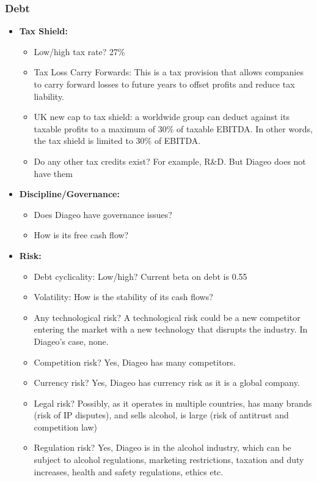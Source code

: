 \subsubsection*{Debt}
\begin{itemize}
    \item \textbf{Tax Shield: }
    \begin{itemize}
        \item Low/high tax rate? 27\%
        \item Tax Loss Carry Forwards: This is a tax provision that allows companies to carry forward losses to future years to offset profits and reduce tax liability.
        \item UK new cap to tax shield: a worldwide group can deduct against its taxable profits to a maximum of 30\% of taxable EBITDA. In other words, the tax shield is limited to 30\% of EBITDA.
        \item Do any other tax credits exist? For example, R\&D. But Diageo does not have them
    \end{itemize}
    \item \textbf{Discipline/Governance: }
    \begin{itemize}
        \item Does Diageo have governance issues?
        \item How is its free cash flow?
    \end{itemize}
    \item \textbf{Risk: }
    \begin{itemize}
        \item Debt cyclicality: Low/high? Current beta on debt is 0.55
        \item Volatility: How is the stability of its cash flows?
        \item Any technological risk? A technological risk could be a new competitor entering the market with a new technology that disrupts the industry. In Diageo's case, none.
        \item Competition risk? Yes, Diageo has many competitors.
        \item Currency risk? Yes, Diageo has currency risk as it is a global company.
        \item Legal risk? Possibly, as it operates in multiple countries, has many brands (risk of IP disputes), and sells alcohol, is large (risk of antitrust and competition law)
        \item Regulation risk? Yes, Diageo is in the alcohol industry, which can be subject to alcohol regulations, marketing restrictions, taxation and duty increases, health and safety regulations, ethics etc.

\end{itemize}
\end{itemize}
